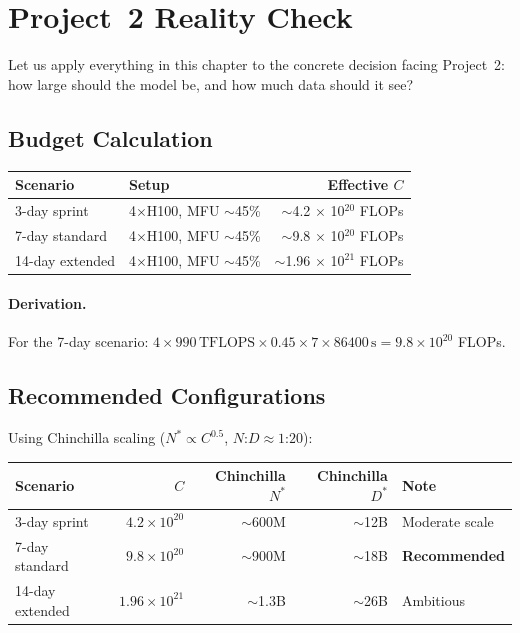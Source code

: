 \section{Project~2 Reality Check}
\label{sec:scaling-project2}

Let us apply everything in this chapter to the concrete decision facing Project~2: how large should the model be, and how much data should it see?

\subsection{Budget Calculation}
\label{sec:budget-calc}

\begin{center}
\begin{tabularx}{\textwidth}{@{}lXr@{}}
\toprule
\textbf{Scenario} & \textbf{Setup} & \textbf{Effective $C$} \\
\midrule
3-day sprint & 4$\times$H100, MFU $\sim$45\% & $\sim$4.2 $\times$ 10$^{20}$ FLOPs \\
7-day standard & 4$\times$H100, MFU $\sim$45\% & $\sim$9.8 $\times$ 10$^{20}$ FLOPs \\
14-day extended & 4$\times$H100, MFU $\sim$45\% & $\sim$1.96 $\times$ 10$^{21}$ FLOPs \\
\bottomrule
\end{tabularx}
\end{center}

\paragraph{Derivation.} For the 7-day scenario: $4 \times 990\,\text{TFLOPS} \times 0.45 \times 7 \times 86400\,\text{s} = 9.8 \times 10^{20}$ FLOPs.

\subsection{Recommended Configurations}
\label{sec:recommended-config}

Using Chinchilla scaling ($N^* \propto C^{0.5}$, $N$:$D \approx 1$:$20$):

\begin{center}
\begin{tabularx}{\textwidth}{@{}lrrrl@{}}
\toprule
\textbf{Scenario} & \textbf{$C$} & \textbf{Chinchilla $N^*$} & \textbf{Chinchilla $D^*$} & \textbf{Note} \\
\midrule
3-day sprint & $4.2 \times 10^{20}$ & $\sim$600M & $\sim$12B & Moderate scale \\
7-day standard & $9.8 \times 10^{20}$ & $\sim$900M & $\sim$18B & \textbf{Recommended} \\
14-day extended & $1.96 \times 10^{21}$ & $\sim$1.3B & $\sim$26B & Ambitious \\
\bottomrule
\end{tabularx}
\end{center}

